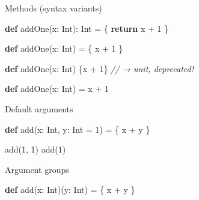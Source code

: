 \documentclass[ignorenonframetext,]{beamer}
\newenvironment{Shaded}{\begin{snugshade}}{\end{snugshade}}
\newcommand{\KeywordTok}[1]{\textcolor[rgb]{0.13,0.29,0.53}{\textbf{#1}}}
\newcommand{\DecValTok}[1]{\textcolor[rgb]{0.00,0.00,0.81}{#1}}
\newcommand{\CommentTok}[1]{\textcolor[rgb]{0.56,0.35,0.01}{\textit{#1}}}
\newcommand{\FunctionTok}[1]{\textcolor[rgb]{0.00,0.00,0.00}{#1}}
\newcommand{\NormalTok}[1]{#1}
\begin{document}
\begin{frame}[fragile]
\begin{block}{Methods (syntax variants)}
\begin{Shaded}
\begin{Highlighting}[]
\KeywordTok{def} \FunctionTok{addOne}\NormalTok{(x: Int): Int = \{}
    \KeywordTok{return}\NormalTok{ x + }\DecValTok{1}
\NormalTok{\}}
\end{Highlighting}
\end{Shaded}

\begin{Shaded}
\begin{Highlighting}[]
\KeywordTok{def} \FunctionTok{addOne}\NormalTok{(x: Int) = \{}
\NormalTok{    x + }\DecValTok{1}
\NormalTok{\}}
\end{Highlighting}
\end{Shaded}

\begin{Shaded}
\begin{Highlighting}[]
\KeywordTok{def} \FunctionTok{addOne}\NormalTok{(x: Int) \{x + }\DecValTok{1}\NormalTok{\}       }\CommentTok{// → unit, deprecated!}
\end{Highlighting}
\end{Shaded}

\begin{Shaded}
\begin{Highlighting}[]
\KeywordTok{def} \FunctionTok{addOne}\NormalTok{(x: Int) = x + }\DecValTok{1}
\end{Highlighting}
\end{Shaded}

\end{block}

\begin{block}{Default arguments}

\begin{Shaded}
\begin{Highlighting}[]
\KeywordTok{def} \FunctionTok{add}\NormalTok{(x: Int, y: Int = }\DecValTok{1}\NormalTok{) = \{ x + y \}}

\FunctionTok{add}\NormalTok{(}\DecValTok{1}\NormalTok{, }\DecValTok{1}\NormalTok{)}
\FunctionTok{add}\NormalTok{(}\DecValTok{1}\NormalTok{)}
\end{Highlighting}
\end{Shaded}

\end{block}

\begin{block}{Argument groups}

\begin{Shaded}
\begin{Highlighting}[]
\KeywordTok{def} \FunctionTok{add}\NormalTok{(x: Int)(y: Int) = \{ x + y \}}


\end{Highlighting}
\end{Shaded}
\end{block}
\end{frame}
\end{document}
